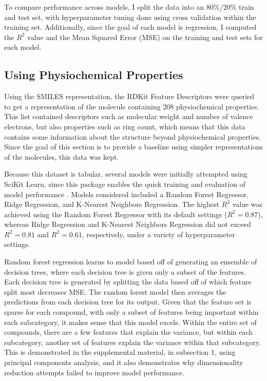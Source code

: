 \documentclass[12pt, oneside]{article}   	%
\begin{document}
To compare performance across models, I split the data into an 80\%/20\% train and test set, with hyperparameter tuning done using cross validation within the training set. Additionally, since the goal of each model is regression, I computed the $R^2$ value and the Mean Squared Error (MSE) on the training and test sets for each model.

\subsection{Using Physiochemical Properties}
Using the SMILES representation, the RDKit Feature Descriptors were queried to get a representation of the molecule containing 208 physiochemical properties. This list contained descriptors such as molecular weight and number of valence electrons, but also properties such as ring count, which means that this data contains some information about the structure beyond physiochemical properties. Since the goal of this section is to provide a baseline using simpler representations of the molecules, this data was kept.

Because this dataset is tabular, several models were initially attempted using SciKit Learn, since this package enables the quick training and evaluation of model performance \cite{scitkit-learn}. Models considered included a Random Forest Regressor, Ridge Regression, and K-Nearest Neighbors Regression. The highest $R^2$ value was achieved using the Random Forest Regressor with its default settings ($R^2=0.87$), whereas Ridge Regression and K-Nearest Neighbors Regression did not exceed $R^2= 0.81$ and $R^2=0.61$, respectively, under a variety of hyperparameter settings.

Random forest regression learns to model based off of generating an ensemble of decision trees, where each decision tree is given only a subset of the features. Each decision tree is generated by splitting the data based off of which feature split most decreases MSE. The random forest model then averages the predictions from each decision tree for its output. Given that the feature set is sparse for each compound, with only a subset of features being important within each subcategory, it makes sense that this model excels. Within the entire set of compounds, there are a few features that explain the variance, but within each subcategory, another set of features explain the variance within that subcategory. This is demonstrated in the supplemental material, in subsection 1, using principal components analysis, and it also demonstrates why dimensionality reduction attempts failed to improve model performance.
\end{document}
